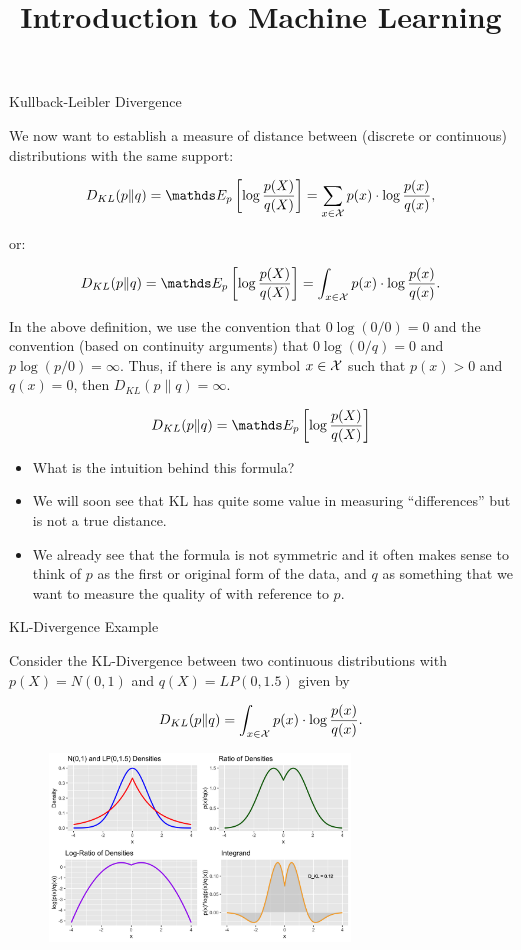 \documentclass[11pt,compress,t,notes=noshow, xcolor=table]{beamer}
\title{Introduction to Machine Learning}
\date{}
\begin{document}


\begin{vbframe} {Kullback-Leibler Divergence}

We now want to establish a measure of distance between (discrete or continuous) distributions with the same support:

  $$ D_{KL}(p \| q) = \E_p \left[\log \frac{p(X)}{q(X)}\right] = \sum_{x \in \Xspace} p(x) \cdot \log \frac{p(x)}{q(x)}, $$
  
  or: 
  
  $$ D_{KL}(p \| q) = \E_p \left[\log \frac{p(X)}{q(X)}\right] = \int_{x \in \Xspace} p(x) \cdot \log \frac{p(x)}{q(x)}. $$

In the above definition, we use the convention that $0 \log (0/0) = 0$ and the
convention (based on continuity arguments) that $0 \log (0/q) = 0$ and $p \log(p/0) = \infty$. 
Thus, if there is any symbol $x \in \mathcal{X}$ such that $p(x) > 0$ and $q(x) = 0$,
then $D_{KL}(p \| q) = \infty.$
  
\framebreak

$$ D_{KL}(p \| q) = \E_p \left[\log \frac{p(X)}{q(X)}\right] $$

\begin{itemize}
  \item  What is the intuition behind this formula?  
  \item  We will soon see that KL has quite some value in measuring \enquote{differences} but is not a true distance. 
  \item  We already see that the formula is not symmetric and it often makes sense to think of $p$ as the first or original form of the data,
    and $q$ as something that we want to measure the quality of with reference to $p$.
  \end{itemize}

\end{vbframe}

\begin{vbframe} {KL-Divergence Example}

Consider the KL-Divergence between two continuous distributions with $p(X)=N(0,1)$ and $q(X)=LP(0, 1.5)$ given by

  $$ D_{KL}(p \| q) = \int_{x \in \mathcal{X}} p(x) \cdot \log \frac{p(x)}{q(x)}. $$

\begin{figure}
\includegraphics[width = 8cm ]{figure/kl_calculation_plot.png} 
\end{figure}

\end{vbframe}
\end{document}
